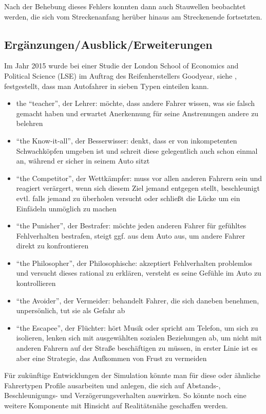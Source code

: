 Nach der Behebung dieses Fehlers konnten dann auch Stauwellen beobachtet werden, die sich vom Streckenanfang herüber hinaus am Streckenende fortsetzten. 



\subsection{Ergänzungen/Ausblick/Erweiterungen}

Im Jahr 2015 wurde bei einer Studie der London School of Economics and Political Science (LSE) im Auftrag des Reifenherstellers Goodyear, siehe \cite{fahrer-typen}, festgestellt, dass man Autofahrer in sieben Typen einteilen kann.

\begin{itemize}
	\item the \enquote{teacher}, der Lehrer: möchte, dass andere Fahrer wissen, was sie falsch gemacht haben und erwartet Anerkennung für seine Anstrenungen andere zu belehren
	\item \enquote{the Know-it-all}, der Besserwisser: denkt, dass er von inkompetenten Schwachköpfen umgeben ist und schreit diese gelegentlich auch schon einmal an, während er sicher in seinem Auto sitzt
	\item \enquote{the Competitor}, der Wettkämpfer: muss vor allen anderen Fahrern sein und reagiert verärgert, wenn sich diesem Ziel jemand entgegen stellt, beschleunigt evtl. falls jemand zu überholen versucht oder schließt die Lücke um ein Einfädeln unmöglich zu machen
	\item \enquote{the Punisher}, der Bestrafer: möchte jeden anderen Fahrer für gefühltes Fehlverhalten bestrafen, steigt ggf. aus dem Auto aus, um andere Fahrer direkt zu konfrontieren
	\item \enquote{the Philosopher}, der Philosophische: akzeptiert Fehlverhalten problemlos und versucht dieses rational zu erklären, versteht es seine Gefühle im Auto zu kontrollieren
	\item \enquote{the Avoider}, der Vermeider: behandelt Fahrer, die sich daneben benehmen, unpersönlich, tut sie als Gefahr ab
	\item \enquote{the Escapee}, der Flüchter: hört Musik oder spricht am Telefon, um sich zu isolieren, lenken sich mit ausgewählten sozialen Beziehungen ab, um nicht mit anderen Fahrern auf der Straße beschäftigen zu müssen, in erster Linie ist es aber eine Strategie, das Aufkommen von Frust zu vermeiden
\end{itemize}

Für zukünftige Entwicklungen der Simulation könnte man für diese oder ähnliche Fahrertypen Profile ausarbeiten und anlegen, die sich auf Abstands-, Beschleunigungs- und Verzögerungsverhalten auswirken.
So könnte noch eine weitere Komponente mit Hinsicht auf Realitätsnähe geschaffen werden. 